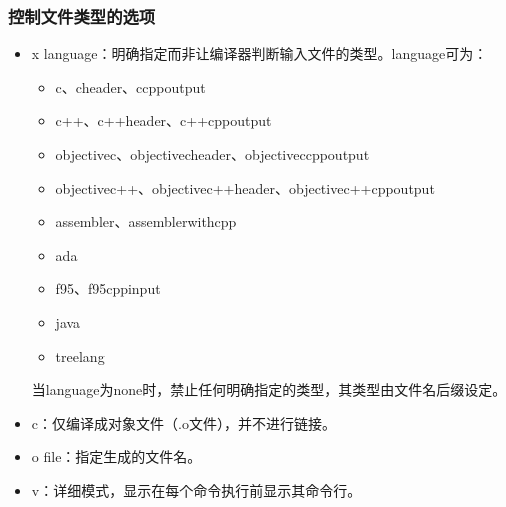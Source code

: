 \documentclass[a4paper,12pt,english]{sphinxmanual}
\begin{document}
\subsubsection{控制文件类型的选项}
\label{\detokenize{compiler/gnu:id3}}\begin{itemize}
\item {} 
\sphinxAtStartPar
\sphinxhyphen{}x language：明确指定而非让编译器判断输入文件的类型。language可为：
\begin{itemize}
\item {} 
\sphinxAtStartPar
c、c\sphinxhyphen{}header、c\sphinxhyphen{}cpp\sphinxhyphen{}output

\item {} 
\sphinxAtStartPar
c++、c++\sphinxhyphen{}header、c++\sphinxhyphen{}cpp\sphinxhyphen{}output

\item {} 
\sphinxAtStartPar
objective\sphinxhyphen{}c、objective\sphinxhyphen{}c\sphinxhyphen{}header、objective\sphinxhyphen{}c\sphinxhyphen{}cpp\sphinxhyphen{}output

\item {} 
\sphinxAtStartPar
objective\sphinxhyphen{}c++、objective\sphinxhyphen{}c++\sphinxhyphen{}header、objective\sphinxhyphen{}c++\sphinxhyphen{}cpp\sphinxhyphen{}output

\item {} 
\sphinxAtStartPar
assembler、assembler\sphinxhyphen{}with\sphinxhyphen{}cpp

\item {} 
\sphinxAtStartPar
ada

\item {} 
\sphinxAtStartPar
f95、f95\sphinxhyphen{}cpp\sphinxhyphen{}input

\item {} 
\sphinxAtStartPar
java

\item {} 
\sphinxAtStartPar
treelang

\end{itemize}

\sphinxAtStartPar
当language为none时，禁止任何明确指定的类型，其类型由文件名后缀设定。

\item {} 
\sphinxAtStartPar
\sphinxhyphen{}c：仅编译成对象文件（.o文件），并不进行链接。

\item {} 
\sphinxAtStartPar
\sphinxhyphen{}o file：指定生成的文件名。

\item {} 
\sphinxAtStartPar
\sphinxhyphen{}v：详细模式，显示在每个命令执行前显示其命令行。


\end{itemize}
\end{document}
